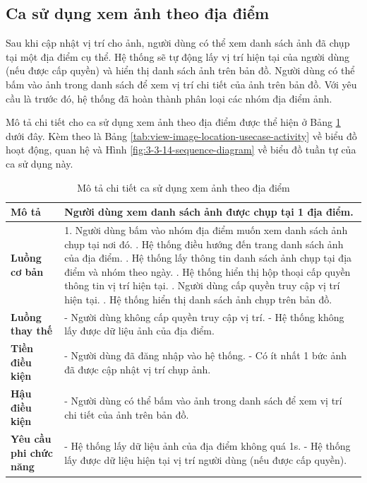 \subsection{Ca sử dụng xem ảnh theo địa điểm}

Sau khi cập nhật vị trí cho ảnh, người dùng có thể xem danh sách ảnh đã chụp tại một địa điểm cụ thể. Hệ thống sẽ tự động lấy vị trí hiện tại của người dùng (nếu được cấp quyền) và hiển thị danh sách ảnh trên bản đồ. Người dùng có thể bấm vào ảnh trong danh sách để xem vị trí chi tiết của ảnh trên bản đồ. Với yêu cầu là trước đó, hệ thống đã hoàn thành phân loại các nhóm địa điểm ảnh.

Mô tả chi tiết cho ca sử dụng xem ảnh theo địa điểm được thể hiện ở Bảng \ref{tab:view-image-location-usecase} dưới đây. Kèm theo là Bảng \ref{tab:view-image-location-usecase-activity} về biểu đồ hoạt động, quan hệ và Hình \ref{fig:3-3-14-sequence-diagram} về biểu đồ tuần tự của ca sử dụng này. 

\noindent 
\begin{table}[H]
\centering
\caption{Mô tả chi tiết ca sử dụng xem ảnh theo địa điểm}
\label{tab:view-image-location-usecase}
\begin{tabularx}{\linewidth}{| l | X |} 
\hline 
\textbf{Mô tả} & Người dùng xem danh sách ảnh được chụp tại 1 địa điểm. \\
\hline 
\textbf{Luồng cơ bản} & 1. Người dùng bấm vào nhóm địa điểm muốn xem danh sách ảnh chụp tại nơi đó. \newline
                       2. Hệ thống điều hướng đến trang danh sách ảnh của địa điểm. \newline
                       3. Hệ thống lấy thông tin danh sách ảnh chụp tại địa điểm và nhóm theo ngày. \newline
                       4. Hệ thống hiển thị hộp thoại cấp quyền thông tin vị trí hiện tại. \newline
                       5. Người dùng cấp quyền truy cập vị trí hiện tại. \newline
                       6. Hệ thống hiển thị danh sách ảnh chụp trên bản đồ. \\
\hline
\textbf{Luồng thay thế} & - Người dùng không cấp quyền truy cập vị trí. \newline
                          - Hệ thống không lấy được dữ liệu ảnh của địa điểm. \\
\hline
\textbf{Tiền điều kiện} & - Người dùng đã đăng nhập vào hệ thống. \newline
                          - Có ít nhất 1 bức ảnh đã được cập nhật vị trí chụp ảnh. \\
\hline
\textbf{Hậu điều kiện} & - Người dùng có thể bấm vào ảnh trong danh sách để xem vị trí chi tiết của ảnh trên bản đồ. \\
\hline 
\textbf{Yêu cầu phi chức năng} & - Hệ thống lấy dữ liệu ảnh của địa điểm không quá 1s. \newline
                           - Hệ thống lấy được dữ liệu hiện tại vị trí người dùng (nếu được cấp quyền). \\
\hline 
\end{tabularx}
\end{table}

